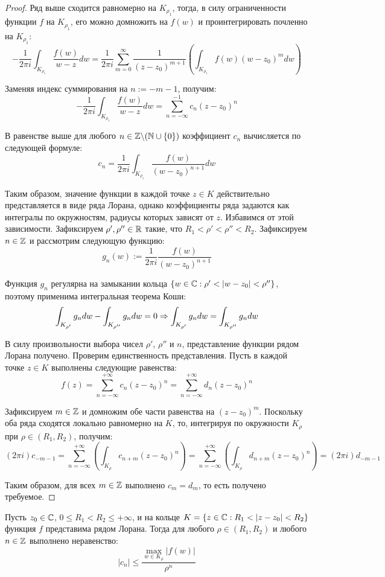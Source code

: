 \begin{proof}
	Ряд выше сходится равномерно на $K_{\rho_1}$, тогда, в силу ограниченности функции $f$ на $K_{\rho_1}$, его можно домножить на $f(w)$ и проинтегрировать почленно на $K_{\rho_1}$:
	\[- \frac1{2\pi i} \int_{K_{\rho_1}}\frac{f(w)}{w - z}dw = \frac1{2\pi i}\sum_{m=0}^\infty\frac1{(z-z_0)^{m + 1}}\left(\int_{K_{\rho_1}}f(w)(w-z_0)^mdw\right)\]
	
	Заменяя индекс суммирования на $n := -m - 1$, получим:
	\[-\frac1{2\pi i} \int_{K_{\rho_1}}\frac{f(w)}{w - z}dw = \sum_{n = -\infty}^{-1}c_n(z - z_0)^n\]
	
	В равенстве выше для любого $n \in \mathbb{Z} \backslash (\mathbb{N} \cup \{0\})$ коэффициент $c_n$ вычисляется по следующей формуле:
	\[c_n = \frac1{2 \pi i}\int_{K_{\rho_1}}\frac{f(w)}{(w - z_0)^{n+1}}dw\]
	
	Таким образом, значение функции в каждой точке $z \in K$ действительно представляется в виде ряда Лорана, однако коэффициенты ряда задаются как интегралы по окружностям, радиусы которых зависят от $z$. Избавимся от этой зависимости. Зафиксируем $\rho', \rho'' \in \mathbb{R}$ такие, что $R_1 < \rho' < \rho'' < R_2$. Зафиксируем $n \in \mathbb{Z}$ и рассмотрим следующую функцию:
	\[g_n(w) := \frac1{2\pi i} \frac{f(w)}{(w - z_0)^{n+1}}\]
	
	Функция $g_n$ регулярна на замыкании кольца $\{w \in \mathbb{C}: \rho' < |w - z_0| < \rho''\}$, поэтому применима интегральная теорема Коши:
	\[\int_{K_{\rho'}}g_ndw - \int_{K_{\rho''}}g_ndw = 0 \Rightarrow \int_{K_{\rho'}}g_ndw = \int_{K_{\rho''}}g_ndw\]
	
	В силу произвольности выбора чисел $\rho'$, $\rho''$ и $n$, представление функции рядом Лорана получено. Проверим единственность представления. Пусть в каждой точке $z \in K$ выполнены следующие равенства:
	\[f(z) = \sum_{n = -\infty}^{+\infty}c_n(z - z_0)^n = \sum_{n = -\infty}^{+\infty}d_n(z - z_0)^n\]
	
	Зафиксируем $m \in \mathbb{Z}$ и домножим обе части равенства на $(z - z_0)^m$. Поскольку оба ряда сходятся локально равномерно на $K$, то, интегрируя по окружности $K_{\rho}$ при $\rho \in (R_1, R_2)$, получим:
	\[{(2\pi i)}{c_{-m - 1}} = \sum_{n = -\infty}^{+\infty}\left(\int_{K_{\rho}}c_{n + m}(z - z_0)^n\right) = \sum_{n = -\infty}^{+\infty}\left(\int_{K_{\rho}}d_{n + m}(z - z_0)^n\right) = {(2\pi i)}{d_{-m - 1}}\]
	
	Таким образом, для всех $m \in \mathbb{Z}$ выполнено $c_m = d_m$, то есть получено требуемое.
\end{proof}

\begin{proposition}
	Пусть $z_0 \in \mathbb{C}$, $0 \le R_1 < R_2 \le +\infty$, и на кольце $K = \{z \in \mathbb{C}: R_1 < |z - z_0| < R_2\}$ функция $f$ представима рядом Лорана. Тогда для любого $\rho \in (R_1, R_2)$ и любого $n \in \mathbb{Z}$ выполнено неравенство:
	\[|c_n| \le \frac{\max_{w \in K_{\rho}}\left|{f(w)}\right|}{\rho^n}\]
\end{proposition}

